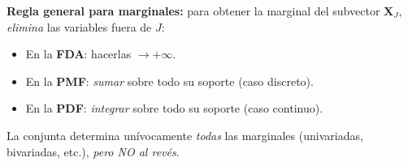 \documentclass[10pt,a4paper]{article}
\numberwithin{equation}{section}
\newenvironment{nota}{\begin{tcolorbox}[notebox]}{\end{tcolorbox}}
\begin{document}
\begin{nota}
  \textbf{Regla general para marginales:} para obtener la marginal del subvector $\mathbf{X}_J$,
  \emph{elimina} las variables fuera de $J$:
  \begin{itemize}
    \item En la \textbf{FDA}: hacerlas $\to +\infty$.
    \item En la \textbf{PMF}: \emph{sumar} sobre todo su soporte (caso discreto).
    \item En la \textbf{PDF}: \emph{integrar} sobre todo su soporte (caso continuo).
  \end{itemize}
  La conjunta determina un\'ivocamente \emph{todas} las marginales (univariadas, bivariadas, etc.),
  \emph{pero NO al rev\'es}.
\end{nota}
\end{document}
